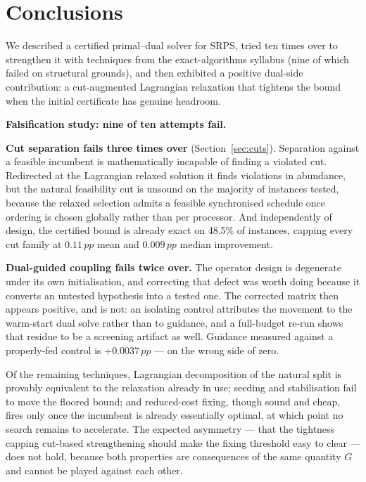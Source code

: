 \documentclass[11pt,a4paper]{article}
\newcommand{\pp}{\,pp}
\begin{document}
\section{Conclusions}\label{sec:conclusions}

We described a certified primal--dual solver for SRPS, tried ten times over to
strengthen it with techniques from the exact-algorithms syllabus (nine of which
failed on structural grounds), and then exhibited a positive dual-side
contribution: a cut-augmented Lagrangian relaxation that tightens
the bound when the initial certificate has genuine headroom.

\textbf{Falsification study: nine of ten attempts fail.}

\textbf{Cut separation fails three times over} (Section~\ref{sec:cuts}). Separation against a feasible
incumbent is
mathematically incapable of finding a violated cut. Redirected at the Lagrangian
relaxed solution it finds violations in abundance, but the natural feasibility cut
is unsound on the majority of instances tested, because the relaxed selection
admits a feasible synchronised schedule once ordering is chosen globally rather
than per processor. And independently of design, the certified bound is already
exact on 48.5\% of instances, capping every cut family at $0.11\pp$ mean and
$0.009\pp$ median improvement.

\textbf{Dual-guided coupling fails twice over.} The operator design is
degenerate under its own
initialisation, and correcting that defect was worth doing because it converts an
untested hypothesis into a tested one. The corrected matrix then appears positive,
and is not: an isolating control attributes the movement to the warm-start dual
solve rather than to guidance, and a full-budget re-run shows that residue to be a
screening artifact as well. Guidance measured against a properly-fed control is
$+0.0037\pp$ --- on the wrong side of zero.

Of the remaining techniques, Lagrangian decomposition of the natural split is
provably equivalent to the relaxation already in use; seeding and stabilisation
fail to move the floored bound; and reduced-cost fixing, though sound and cheap,
fires only once the incumbent is already essentially optimal, at which point no
search remains to accelerate. The expected asymmetry --- that the tightness capping
cut-based strengthening should make the fixing threshold easy to clear --- does not
hold, because both properties are consequences of the same quantity $G$ and cannot
be played against each other.
\end{document}
